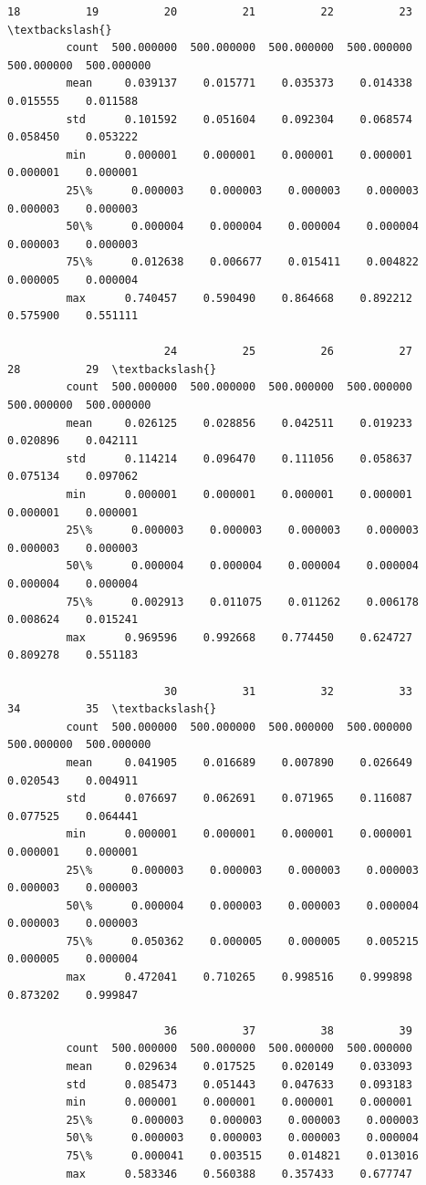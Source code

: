 \documentclass[11pt]{article}
\begin{document}
\begin{Verbatim}[commandchars=\\\{\}]
                        18          19          20          21          22          23  \textbackslash{}
         count  500.000000  500.000000  500.000000  500.000000  500.000000  500.000000   
         mean     0.039137    0.015771    0.035373    0.014338    0.015555    0.011588   
         std      0.101592    0.051604    0.092304    0.068574    0.058450    0.053222   
         min      0.000001    0.000001    0.000001    0.000001    0.000001    0.000001   
         25\%      0.000003    0.000003    0.000003    0.000003    0.000003    0.000003   
         50\%      0.000004    0.000004    0.000004    0.000004    0.000003    0.000003   
         75\%      0.012638    0.006677    0.015411    0.004822    0.000005    0.000004   
         max      0.740457    0.590490    0.864668    0.892212    0.575900    0.551111   
         
                        24          25          26          27          28          29  \textbackslash{}
         count  500.000000  500.000000  500.000000  500.000000  500.000000  500.000000   
         mean     0.026125    0.028856    0.042511    0.019233    0.020896    0.042111   
         std      0.114214    0.096470    0.111056    0.058637    0.075134    0.097062   
         min      0.000001    0.000001    0.000001    0.000001    0.000001    0.000001   
         25\%      0.000003    0.000003    0.000003    0.000003    0.000003    0.000003   
         50\%      0.000004    0.000004    0.000004    0.000004    0.000004    0.000004   
         75\%      0.002913    0.011075    0.011262    0.006178    0.008624    0.015241   
         max      0.969596    0.992668    0.774450    0.624727    0.809278    0.551183   
         
                        30          31          32          33          34          35  \textbackslash{}
         count  500.000000  500.000000  500.000000  500.000000  500.000000  500.000000   
         mean     0.041905    0.016689    0.007890    0.026649    0.020543    0.004911   
         std      0.076697    0.062691    0.071965    0.116087    0.077525    0.064441   
         min      0.000001    0.000001    0.000001    0.000001    0.000001    0.000001   
         25\%      0.000003    0.000003    0.000003    0.000003    0.000003    0.000003   
         50\%      0.000004    0.000003    0.000003    0.000004    0.000003    0.000003   
         75\%      0.050362    0.000005    0.000005    0.005215    0.000005    0.000004   
         max      0.472041    0.710265    0.998516    0.999898    0.873202    0.999847   
         
                        36          37          38          39  
         count  500.000000  500.000000  500.000000  500.000000  
         mean     0.029634    0.017525    0.020149    0.033093  
         std      0.085473    0.051443    0.047633    0.093183  
         min      0.000001    0.000001    0.000001    0.000001  
         25\%      0.000003    0.000003    0.000003    0.000003  
         50\%      0.000003    0.000003    0.000003    0.000004  
         75\%      0.000041    0.003515    0.014821    0.013016  
         max      0.583346    0.560388    0.357433    0.677747  
\end{Verbatim}
            
\end{document}
